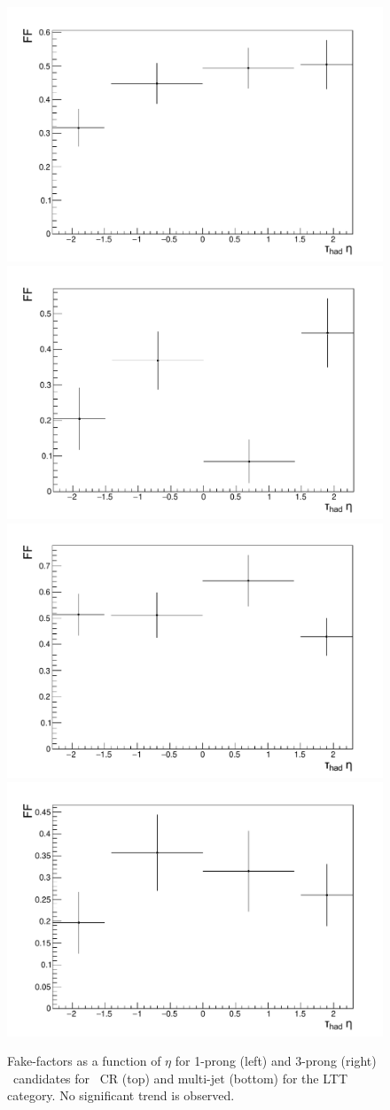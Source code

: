 \begin{figure}
\centering
\includegraphics[width=.4\textwidth]{DiHiggs/plots/lephadFF/LTT/FF_All_Preselection_Np1_HighMtCR_2tag_Tau0Eta}
\includegraphics[width=.4\textwidth]{DiHiggs/plots/lephadFF/LTT/FF_All_Preselection_Np3_HighMtCR_2tag_Tau0Eta}\\
\includegraphics[width=.4\textwidth]{DiHiggs/plots/lephadFF/LTT/FF_All_Preselection_Np1_CR_2tag_Tau0Eta}
\includegraphics[width=.4\textwidth]{DiHiggs/plots/lephadFF/LTT/FF_All_Preselection_Np3_CR_2tag_Tau0Eta} \\
\caption{Fake-factors as a function of $\eta$ for 1-prong (left) and 3-prong (right) \tauhad\ candidates for \ttbar\ CR (top) 
and multi-jet (bottom) for the \lephad LTT category. No significant trend is observed.}
\label{fig:lhFF_eta_LTT}
\end{figure}

